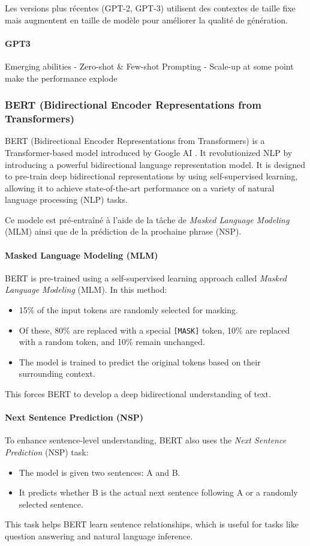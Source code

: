 \documentclass{article}
\begin{document}
Les versions plus récentes (GPT-2, GPT-3) utilisent des contextes de taille fixe mais augmentent en taille de modèle pour améliorer la qualité de génération.

\paragraph{GPT3}

Emerging abilities 
- Zero-shot \& Few-shot Prompting
- Scale-up at some point make the performance explode

\subsubsection{BERT (Bidirectional Encoder Representations from Transformers)}
BERT (Bidirectional Encoder Representations from Transformers) is a Transformer-based model introduced by Google AI \cite{devlin2018bert}. It revolutionized NLP by introducing a powerful bidirectional language representation model. It is designed to pre-train deep bidirectional representations by using self-supervised learning, allowing it to achieve state-of-the-art performance on a variety of natural language processing (NLP) tasks.

Ce modele est pré-entraîné à l'aide de la tâche de \textit{Masked Language Modeling} (MLM) ainsi que de la prédiction de la prochaine phrase (NSP).

\paragraph{Masked Language Modeling (MLM)} BERT is pre-trained using a self-supervised learning approach called \textit{Masked Language Modeling} (MLM). In this method:
\begin{itemize}
    \item 15\% of the input tokens are randomly selected for masking.
    \item Of these, 80\% are replaced with a special \texttt{[MASK]} token, 10\% are replaced with a random token, and 10\% remain unchanged.
    \item The model is trained to predict the original tokens based on their surrounding context.
\end{itemize}
This forces BERT to develop a deep bidirectional understanding of text.

\paragraph{Next Sentence Prediction (NSP)} To enhance sentence-level understanding, BERT also uses the \textit{Next Sentence Prediction} (NSP) task:
\begin{itemize}
    \item The model is given two sentences: A and B.
    \item It predicts whether B is the actual next sentence following A or a randomly selected sentence.
\end{itemize}
This task helps BERT learn sentence relationships, which is useful for tasks like question answering and natural language inference.
\end{document}
